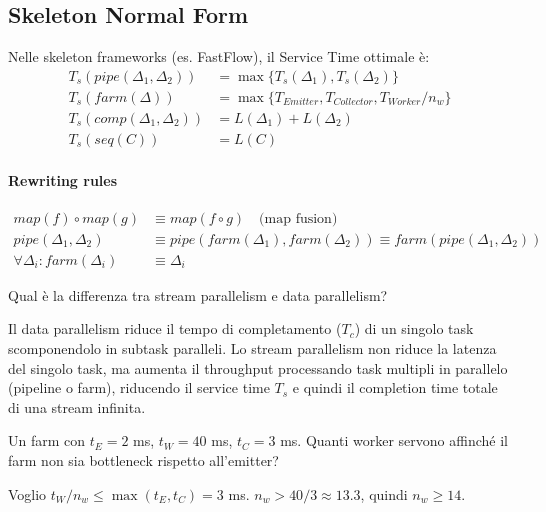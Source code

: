 \documentclass[11pt,a4paper]{article}
\theoremstyle{remark}
\newenvironment{esercizio}[1][]{%
  \begin{tcolorbox}[breakable,title={\textbf{Esercizio / Domanda d'esame}\ifx&#1&\else: #1\fi},
    colback=yellow!5!white, colframe=orange!75!black, fonttitle=\small\bfseries]%
}{%
  \end{tcolorbox}%
}
\newenvironment{risposta}{%
  \begin{tcolorbox}[breakable,title={\textbf{Risposta}},
    colback=green!5!white, colframe=green!50!black, fonttitle=\small\bfseries]%
}{%
  \end{tcolorbox}%
}
\begin{document}
\subsection{Skeleton Normal Form}

Nelle skeleton frameworks (es. FastFlow), il Service Time ottimale è:
\begin{align*}
  T_s(pipe(\Delta_1, \Delta_2)) &= \max\{T_s(\Delta_1), T_s(\Delta_2)\} \\
  T_s(farm(\Delta)) &= \max\{T_{Emitter}, T_{Collector}, T_{Worker}/n_w\} \\
  T_s(comp(\Delta_1, \Delta_2)) &= L(\Delta_1) + L(\Delta_2) \\
  T_s(seq(C)) &= L(C)
\end{align*}

\paragraph{Rewriting rules}
\begin{align*}
  map(f) \circ map(g) &\equiv map(f \circ g) \quad \text{(map fusion)} \\
  pipe(\Delta_1, \Delta_2) &\equiv pipe(farm(\Delta_1), farm(\Delta_2)) \equiv farm(pipe(\Delta_1, \Delta_2)) \\
  \forall \Delta_i: farm(\Delta_i) &\equiv \Delta_i
\end{align*}

\begin{esercizio}
Qual è la differenza tra stream parallelism e data parallelism?
\end{esercizio}
\begin{risposta}
Il data parallelism riduce il tempo di completamento ($T_c$) di un singolo task scomponendolo in subtask paralleli. Lo stream parallelism non riduce la latenza del singolo task, ma aumenta il throughput processando task multipli in parallelo (pipeline o farm), riducendo il service time $T_s$ e quindi il completion time totale di una stream infinita.
\end{risposta}

\begin{esercizio}
Un farm con $t_E = 2$ ms, $t_W = 40$ ms, $t_C = 3$ ms. Quanti worker servono affinché il farm non sia bottleneck rispetto all'emitter?
\end{esercizio}
\begin{risposta}
Voglio $t_W/n_w \leq \max(t_E, t_C) = 3$ ms. $n_w > 40/3 \approx 13.3$, quindi $n_w \geq 14$.
\end{risposta}
\end{document}
